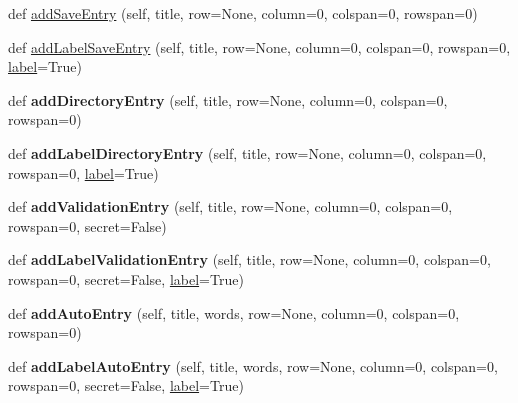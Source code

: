 \begin{DoxyCompactItemize}
\item 
def \hyperlink{class_python_01_g_u_i_1_1appjar_1_1gui_a689b3e6fc4be6375e86e20f616ee7851}{add\+Save\+Entry} (self, title, row=None, column=0, colspan=0, rowspan=0)
\item 
def \hyperlink{class_python_01_g_u_i_1_1appjar_1_1gui_aaa0ff835e828bb6fdb9ed8eaefd5f5b6}{add\+Label\+Save\+Entry} (self, title, row=None, column=0, colspan=0, rowspan=0, \hyperlink{class_python_01_g_u_i_1_1appjar_1_1gui_a899e593dca96dd2a31035558b685e3bd}{label}=True)
\item 
\mbox{\label{class_python_01_g_u_i_1_1appjar_1_1gui_a69f5f1ab154760b7f217c711c5e49644}} 
def {\bfseries add\+Directory\+Entry} (self, title, row=None, column=0, colspan=0, rowspan=0)
\item 
\mbox{\label{class_python_01_g_u_i_1_1appjar_1_1gui_a38819a64bcc3b57e4f14ceb37aadd10c}} 
def {\bfseries add\+Label\+Directory\+Entry} (self, title, row=None, column=0, colspan=0, rowspan=0, \hyperlink{class_python_01_g_u_i_1_1appjar_1_1gui_a899e593dca96dd2a31035558b685e3bd}{label}=True)
\item 
\mbox{\label{class_python_01_g_u_i_1_1appjar_1_1gui_a3f152f132b4d5ecceca9da3a3a08249c}} 
def {\bfseries add\+Validation\+Entry} (self, title, row=None, column=0, colspan=0, rowspan=0, secret=False)
\item 
\mbox{\label{class_python_01_g_u_i_1_1appjar_1_1gui_a9ab53328b63936a74cd06d3d178a5f0f}} 
def {\bfseries add\+Label\+Validation\+Entry} (self, title, row=None, column=0, colspan=0, rowspan=0, secret=False, \hyperlink{class_python_01_g_u_i_1_1appjar_1_1gui_a899e593dca96dd2a31035558b685e3bd}{label}=True)
\item 
\mbox{\label{class_python_01_g_u_i_1_1appjar_1_1gui_a2e40a05c4deb74d7dd1567eff9137e10}} 
def {\bfseries add\+Auto\+Entry} (self, title, words, row=None, column=0, colspan=0, rowspan=0)
\item 
\mbox{\label{class_python_01_g_u_i_1_1appjar_1_1gui_ad603aabab35b81c485cd4590ca9080de}} 
def {\bfseries add\+Label\+Auto\+Entry} (self, title, words, row=None, column=0, colspan=0, rowspan=0, secret=False, \hyperlink{class_python_01_g_u_i_1_1appjar_1_1gui_a899e593dca96dd2a31035558b685e3bd}{label}=True)

\end{DoxyCompactItemize}
